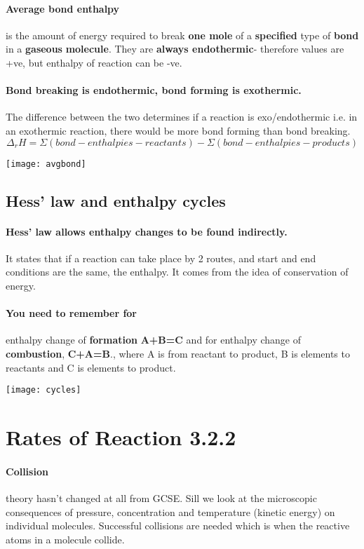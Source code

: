 \paragraph{Average bond enthalpy}is the amount of energy required to break \textbf{one mole} of a \textbf{specified} type of \textbf{bond} in a \textbf{gaseous} \textbf{molecule}. They are \textbf{always endothermic}- therefore values are +ve, but enthalpy of reaction can be -ve.
\paragraph{Bond breaking is endothermic, bond forming is exothermic.} The difference between the two determines if a reaction is exo/endothermic i.e. in an exothermic reaction, there would be more bond forming than bond breaking.
\begin{equation}
\Delta_rH= \Sigma(bond- enthalpies- reactants)-\Sigma(bond- enthalpies- products)
\end{equation}
\begin{center}
\texttt{[image: avgbond]}
\end{center}
\subsection{Hess' law and enthalpy cycles}
\paragraph{Hess' law allows enthalpy changes to be found indirectly.}It states that if a reaction can take place by 2 routes, and start and end conditions are the same, the enthalpy. It comes from the idea of conservation of energy.
\paragraph{You need to remember for}enthalpy change of \textbf{formation} \textbf{A+B=C} and for enthalpy change of \textbf{combustion}, \textbf{C+A=B}., where A is from reactant to product, B is elements to reactants and C is elements to product.
\newpage
\begin{center}
\texttt{[image: cycles]}
\end{center}


\section{Rates of Reaction 3.2.2}
	\paragraph{Collision} theory hasn't changed at all from GCSE.
	Sill we look at the microscopic consequences of pressure, concentration and temperature (kinetic energy) on individual molecules.
	Successful collisions are needed which is when the reactive atoms in a molecule collide.
	
